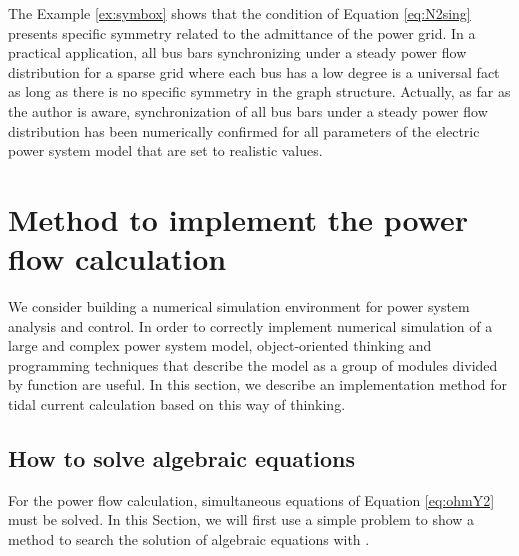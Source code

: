 \documentclass[tombow,dvipdfmx]{corona-a5-1.1}
\begin{document}
The Example \ref{ex:symbox} shows that the condition of Equation \ref{eq:N2sing} presents specific symmetry related to the admittance of the power grid.
In a practical application, all bus bars synchronizing under a steady power flow distribution for a sparse grid where each bus has a low degree is a universal fact as long as there is no specific symmetry in the graph structure.
Actually, as far as the author is aware, synchronization of all bus bars under a steady power flow distribution has been numerically confirmed for all parameters of the electric power system model that are set to realistic values. 


\section{Method to implement the power flow calculation}\label{sec:powfcal}
We consider building a numerical simulation environment for power system analysis and control.
In order to correctly implement numerical simulation of a large and complex power system model, object-oriented thinking and programming techniques that describe the model as a group of modules divided by function are useful.
In this section, we describe an implementation method for tidal current calculation based on this way of thinking.


\subsection{How to solve algebraic equations}
For the power flow calculation, simultaneous equations of Equation \ref{eq:ohmY2} must be solved.
In this Section, we will first use a simple problem to show a method to search the solution of algebraic equations with \matlab.
\end{document}

